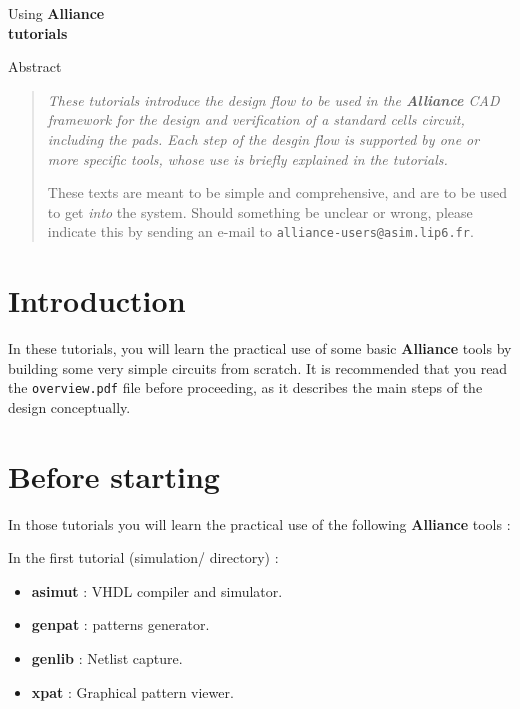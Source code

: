 \documentclass{article}
\begin{document}
\begin{center}
\Huge Using \bf Alliance\\
\Huge tutorials
\end{center}
\vspace{2cm}

%
\begin{center}
Abstract

\begin{quote}
\em
These tutorials introduce the design flow to be used in the
\textbf{Alliance} CAD framework for the design and verification of a 
standard cells circuit, including the pads.
Each step of the desgin flow is supported by one or more specific 
tools, whose use is briefly explained in the tutorials.

These texts are meant to be simple and comprehensive, and are to be used
to get \emph{into} the system.
Should something be unclear or wrong, please indicate this by sending
an e-mail to \texttt{alliance-users@asim.lip6.fr}.
\rm
\end{quote}
\end{center}


\section{Introduction}
In these tutorials, you will learn the practical use of some basic
\textbf{Alliance} tools by building some very simple circuits from scratch.
It is recommended that you read the \texttt{overview.pdf} file before
proceeding, as it describes the main steps of the design conceptually.

\section{Before starting}
In those tutorials you will learn the practical use of the following 
\textbf{Alliance} tools :

In the first tutorial (simulation/ directory) :
\begin{itemize}
\item \textbf{asimut} : VHDL compiler and simulator.
\item \textbf{genpat} : patterns generator.
\item \textbf{genlib} : Netlist capture.
\item \textbf{xpat}   : Graphical pattern viewer.
\end{itemize}
\end{document}
